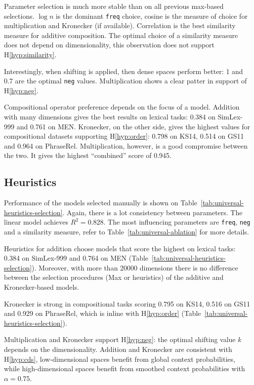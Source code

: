 Parameter selection is much more stable than on all previous max-based selections. $\log n$ is the dominant \texttt{freq} choice, cosine is the measure of choice for multiplication and Kronecker (if available). Correlation is the best similarity measure for additive composition. The optimal choice of a similarity measure does not depend on dimensionality, this observation does not support H\ref{hyp:similarity}.

Interestingly, when shifting is applied, then dense spaces perform better: 1 and 0.7 are the optimal \texttt{neg} values. Multiplication shows a clear patter in support of H\ref{hyp:neg}.

Compositional operator preference depends on the focus of a model.
Addition with many dimensions gives the best results on lexical tasks: 0.384 on SimLex-999 and 0.761 on MEN. Kronecker, on the other side, gives the highest values for compositional datasets supporting H\ref{hyp:order}: 0.798 on KS14, 0.514 on GS11 and 0.964 on PhraseRel. Multiplication, however, is a good compromise between the two. It gives the highest ``combined'' score of 0.945.

\subsection{Heuristics}
\label{sec:heuristics-universal}



Performance of the models selected manually is shown on Table~\ref{tab:universal-heuristics-selection}. Again, there is a lot consistency between parameters. The linear model achieves $R^2 = 0.828$. The most influencing parameters are \texttt{freq}, \texttt{neg} and a similarity measure, refer to Table~\ref{tab:universal-ablation} for more details.

Heuristics for addition choose models that score the highest on lexical tasks: 0.384 on SimLex-999 and 0.764 on MEN (Table~\ref{tab:universal-heuristics-selection}). Moreover, with more than 20000 dimensions there is no difference between the selection procedures (Max or heuristics) of the additive and Kronecker-based models.

Kronecker is strong in compositional tasks scoring 0.795 on KS14, 0.516 on GS11 and 0.929 on PhraseRel, which is inline with H\ref{hyp:order} (Table~\ref{tab:universal-heuristics-selection}).

Multiplication and Kronecker support H\ref{hyp:neg}: the optimal shifting value $k$ depends on the dimensionality. Addition and Kronecker are consistent with H\ref{hyp:cds}, low-dimensional spaces benefit from global context probabilities, while high-dimensional spaces benefit from smoothed context probabilities with $\alpha=0.75$.

